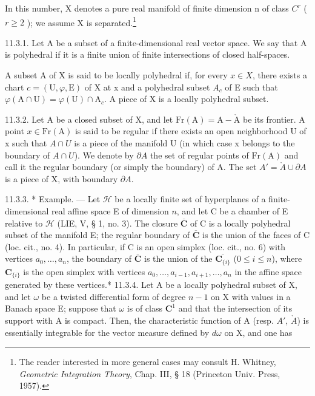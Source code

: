 In this number, X denotes a pure real manifold of finite dimension n of class \(C^{r}\) ( \(r \geqslant 2\) ); we assume X is separated.\footnote{The reader interested in more general cases may consult H. Whitney, \emph{Geometric Integration Theory}, Chap. III, § 18 (Princeton Univ. Press, 1957).}

11.3.1. Let A be a subset of a finite-dimensional real vector space. We say that A is polyhedral if it is a finite union of finite intersections of closed half-spaces.

A subset A of X is said to be locally polyhedral if, for every \(x \in X\), there exists a chart \(c = (\mathrm{U}, \varphi, \mathrm{E})\) of X at x and a polyhedral subset \(A_{c}\) of E such that \(\varphi(\mathrm{A} \cap \mathrm{U}) = \varphi(\mathrm{U}) \cap \mathrm{A}_{c}\). A piece of X is a locally polyhedral subset.

11.3.2. Let A be a closed subset of X, and let \(\mathrm{Fr}(\mathrm{A}) = \mathrm{A} - \mathring{\mathrm{A}}\) be its frontier. A point \(x \in \mathrm{Fr}(\mathrm{A})\) is said to be regular if there exists an open neighborhood U of x such that \(A \cap U\) is a piece of the manifold U (in which case x belongs to the boundary of \(A \cap U\)). We denote by \(\partial A\) the set of regular points of \(\mathrm{Fr}(\mathrm{A})\) and call it the regular boundary (or simply the boundary) of A. The set \(A' = \mathring{A} \cup \partial A\) is a piece of X, with boundary \(\partial A\).

11.3.3. * Example. --- Let \(\mathcal{H}\) be a locally finite set of hyperplanes of a finite-dimensional real affine space E of dimension \(n\), and let C be a chamber of E relative to \(\mathcal{H}\) (LIE, V, § 1, no. 3). The closure \(\overline{\mathbf{C}}\) of C is a locally polyhedral subset of the manifold E; the regular boundary of \(\overline{\mathbf{C}}\) is the union of the faces of C (loc. cit., no. 4). In particular, if C is an open simplex (loc. cit., no. 6) with vertices \(a_0, \ldots, a_n\), the boundary of \(\overline{\mathbf{C}}\) is the union of the \(\overline{\mathbf{C}_{\{i\}}}\) (\(0 \leqslant i \leqslant n\)), where \(\mathbf{C}_{\{i\}}\) is the open simplex with vertices \(a_0, \ldots, a_{i-1}, a_{i+1}, \ldots, a_n\) in the affine space generated by these vertices.* 
11.3.4. Let A be a locally polyhedral subset of X, and let \(\omega\) be a twisted differential form of degree \(n - 1\) on X with values in a Banach space E; suppose that \(\omega\) is of class \(\mathbf{C}^1\) and that the intersection of its support with A is compact. Then, the characteristic function of A (resp. \(A'\), \(\mathring{A}\)) is essentially integrable for the vector measure defined by \(d\omega\) on X, and one has

